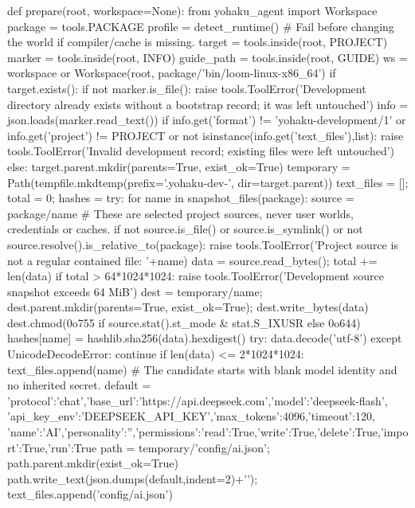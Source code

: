 def prepare(root, workspace=None):
    from yohaku_agent import Workspace
    package = tools.PACKAGE
    profile = detect_runtime()  # Fail before changing the world if compiler/cache is missing.
    target = tools.inside(root, PROJECT)
    marker = tools.inside(root, INFO)
    guide_path = tools.inside(root, GUIDE)
    ws = workspace or Workspace(root, package/'bin/loom-linux-x86_64')
    if target.exists():
        if not marker.is_file(): raise tools.ToolError('Development directory already exists without a bootstrap record; it was left untouched')
        info = json.loads(marker.read_text())
        if info.get('format') != 'yohaku-development/1' or info.get('project') != PROJECT or not isinstance(info.get('text_files'),list):
            raise tools.ToolError('Invalid development record; existing files were left untouched')
    else:
        target.parent.mkdir(parents=True, exist_ok=True)
        temporary = Path(tempfile.mkdtemp(prefix='.yohaku-dev-', dir=target.parent))
        text_files = []; total = 0; hashes = {}
        try:
            for name in snapshot_files(package):
                source = package/name
                # These are selected project sources, never user worlds, credentials or caches.
                if not source.is_file() or source.is_symlink() or not source.resolve().is_relative_to(package):
                    raise tools.ToolError('Project source is not a regular contained file: '+name)
                data = source.read_bytes(); total += len(data)
                if total > 64*1024*1024: raise tools.ToolError('Development source snapshot exceeds 64 MiB')
                dest = temporary/name; dest.parent.mkdir(parents=True, exist_ok=True); dest.write_bytes(data)
                dest.chmod(0o755 if source.stat().st_mode & stat.S_IXUSR else 0o644)
                hashes[name] = hashlib.sha256(data).hexdigest()
                try: data.decode('utf-8')
                except UnicodeDecodeError: continue
                if len(data) <= 2*1024*1024: text_files.append(name)
            # The candidate starts with blank model identity and no inherited secret.
            default = {'protocol':'chat','base_url':'https://api.deepseek.com','model':'deepseek-flash',
                       'api_key_env':'DEEPSEEK_API_KEY','max_tokens':4096,'timeout':120,
                       'name':'AI','personality':'','permissions':{'read':True,'write':True,'delete':True,'import':True,'run':True}}
            path = temporary/'config/ai.json'; path.parent.mkdir(exist_ok=True)
            path.write_text(json.dumps(default,indent=2)+'\n'); text_files.append('config/ai.json')
